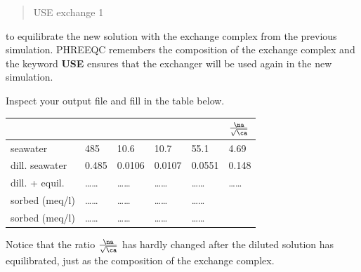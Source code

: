 \begin{quote}
USE exchange 1
\end{quote}

to equilibrate the new solution with the exchange complex from the previous simulation. PHREEQC remembers the composition of the exchange complex and the keyword \textbf{USE} ensures that the exchanger will be used again in the new simulation.

Inspect your output file and fill in the table below.

\begin{table}[h]
\centering
\footnotesize
\begin{tabular}{llllll}
\toprule
 & \na	& \ka & \ca & \mg & $\frac{\na}{\sqrt{\ca}}$ \\
\midrule
seawater 				& 485   & 10.6   & 10.7   & 55.1   & 4.69 \\
dill. seawater  & 0.485 & 0.0106 & 0.0107 & 0.0551 & 0.148 \\
dill. + equil.  & \ldots\ldots & \ldots\ldots & \ldots\ldots & \ldots\ldots & \ldots\ldots \\
sorbed (meq/l)  & \ldots\ldots & \ldots\ldots & \ldots\ldots & \ldots\ldots & \\
sorbed (meq/l)  & \ldots\ldots & \ldots\ldots & \ldots\ldots & \ldots\ldots & \\
\bottomrule
\end{tabular}
\end{table}

Notice that the ratio $\frac{\na}{\sqrt{\ca}}$ has hardly changed after the diluted solution has equilibrated, just as the composition of the exchange complex.